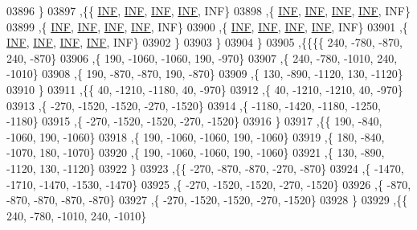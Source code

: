 \begin{DoxyCode}
03896     \}
03897    ,\{\{   \hyperlink{constants_8h_a12c2040f25d8e3a7b9e1c2024c618cb6}{INF},   \hyperlink{constants_8h_a12c2040f25d8e3a7b9e1c2024c618cb6}{INF},   \hyperlink{constants_8h_a12c2040f25d8e3a7b9e1c2024c618cb6}{INF},   \hyperlink{constants_8h_a12c2040f25d8e3a7b9e1c2024c618cb6}{INF},   INF\}
03898     ,\{   \hyperlink{constants_8h_a12c2040f25d8e3a7b9e1c2024c618cb6}{INF},   \hyperlink{constants_8h_a12c2040f25d8e3a7b9e1c2024c618cb6}{INF},   \hyperlink{constants_8h_a12c2040f25d8e3a7b9e1c2024c618cb6}{INF},   \hyperlink{constants_8h_a12c2040f25d8e3a7b9e1c2024c618cb6}{INF},   INF\}
03899     ,\{   \hyperlink{constants_8h_a12c2040f25d8e3a7b9e1c2024c618cb6}{INF},   \hyperlink{constants_8h_a12c2040f25d8e3a7b9e1c2024c618cb6}{INF},   \hyperlink{constants_8h_a12c2040f25d8e3a7b9e1c2024c618cb6}{INF},   \hyperlink{constants_8h_a12c2040f25d8e3a7b9e1c2024c618cb6}{INF},   INF\}
03900     ,\{   \hyperlink{constants_8h_a12c2040f25d8e3a7b9e1c2024c618cb6}{INF},   \hyperlink{constants_8h_a12c2040f25d8e3a7b9e1c2024c618cb6}{INF},   \hyperlink{constants_8h_a12c2040f25d8e3a7b9e1c2024c618cb6}{INF},   \hyperlink{constants_8h_a12c2040f25d8e3a7b9e1c2024c618cb6}{INF},   INF\}
03901     ,\{   \hyperlink{constants_8h_a12c2040f25d8e3a7b9e1c2024c618cb6}{INF},   \hyperlink{constants_8h_a12c2040f25d8e3a7b9e1c2024c618cb6}{INF},   \hyperlink{constants_8h_a12c2040f25d8e3a7b9e1c2024c618cb6}{INF},   \hyperlink{constants_8h_a12c2040f25d8e3a7b9e1c2024c618cb6}{INF},   INF\}
03902     \}
03903    \}
03904   \}
03905  ,\{\{\{\{   240,  -780,  -870,   240,  -870\}
03906     ,\{   190, -1060, -1060,   190,  -970\}
03907     ,\{   240,  -780, -1010,   240, -1010\}
03908     ,\{   190,  -870,  -870,   190,  -870\}
03909     ,\{   130,  -890, -1120,   130, -1120\}
03910     \}
03911    ,\{\{    40, -1210, -1180,    40,  -970\}
03912     ,\{    40, -1210, -1210,    40,  -970\}
03913     ,\{  -270, -1520, -1520,  -270, -1520\}
03914     ,\{ -1180, -1420, -1180, -1250, -1180\}
03915     ,\{  -270, -1520, -1520,  -270, -1520\}
03916     \}
03917    ,\{\{   190,  -840, -1060,   190, -1060\}
03918     ,\{   190, -1060, -1060,   190, -1060\}
03919     ,\{   180,  -840, -1070,   180, -1070\}
03920     ,\{   190, -1060, -1060,   190, -1060\}
03921     ,\{   130,  -890, -1120,   130, -1120\}
03922     \}
03923    ,\{\{  -270,  -870,  -870,  -270,  -870\}
03924     ,\{ -1470, -1710, -1470, -1530, -1470\}
03925     ,\{  -270, -1520, -1520,  -270, -1520\}
03926     ,\{  -870,  -870,  -870,  -870,  -870\}
03927     ,\{  -270, -1520, -1520,  -270, -1520\}
03928     \}
03929    ,\{\{   240,  -780, -1010,   240, -1010\}

\end{DoxyCode}
